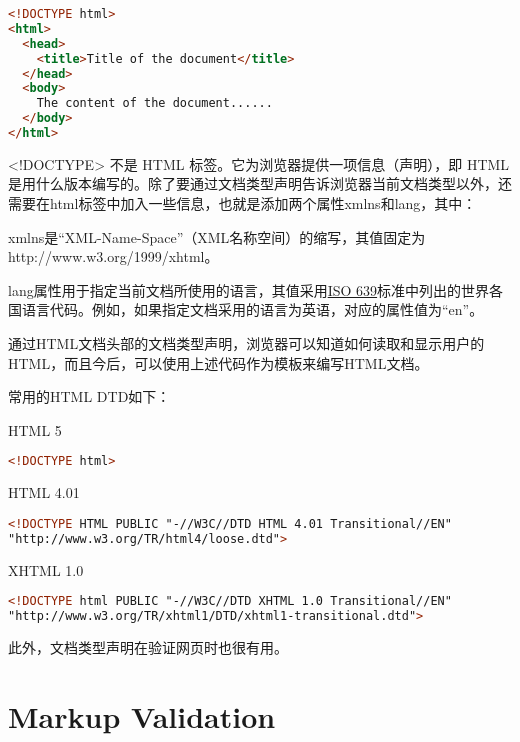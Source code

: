 \begin{lstlisting}[language=HTML]
<!DOCTYPE html>
<html>
  <head>
    <title>Title of the document</title>
  </head>
  <body>
    The content of the document......
  </body>
</html>
\end{lstlisting}


<!DOCTYPE> 不是 HTML 标签。它为浏览器提供一项信息（声明），即 HTML 是用什么版本编写的。除了要通过文档类型声明告诉浏览器当前文档类型以外，还需要在html标签中加入一些信息，也就是添加两个属性xmlns和lang，其中：

\begin{compactitem}
\item xmlns是“XML-Name-Space”（XML名称空间）的缩写，其值固定为http://www.w3.org/1999/xhtml。
\item lang属性用于指定当前文档所使用的语言，其值采用\href{http://www.w3.org/WAI/ER/IG/ert/iso639.htm#2letter}{ISO 639}标准中列出的世界各国语言代码。例如，如果指定文档采用的语言为英语，对应的属性值为“en”。
\end{compactitem}

通过HTML文档头部的文档类型声明，浏览器可以知道如何读取和显示用户的HTML，而且今后，可以使用上述代码作为模板来编写HTML文档。

常用的HTML DTD如下：

\begin{compactitem}
\item HTML 5
\begin{lstlisting}[language=HTML]
<!DOCTYPE html>
\end{lstlisting}

\item HTML 4.01
\begin{lstlisting}[language=HTML]
<!DOCTYPE HTML PUBLIC "-//W3C//DTD HTML 4.01 Transitional//EN"
"http://www.w3.org/TR/html4/loose.dtd">
\end{lstlisting}

\item XHTML 1.0
\begin{lstlisting}[language=HTML]
<!DOCTYPE html PUBLIC "-//W3C//DTD XHTML 1.0 Transitional//EN"
"http://www.w3.org/TR/xhtml1/DTD/xhtml1-transitional.dtd">
\end{lstlisting}

\end{compactitem}

此外，文档类型声明在验证网页时也很有用。




\section{Markup Validation}

